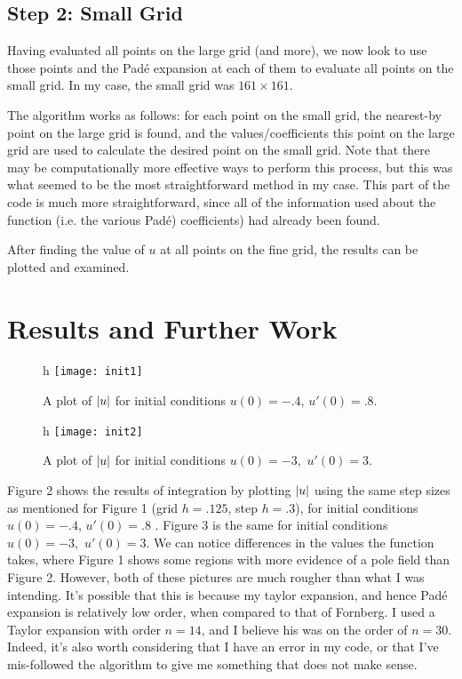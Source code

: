 \documentclass[12pt]{article}
\begin{document}
\subsection{ Step 2: Small Grid }
Having evaluated all points on the large grid (and more), we now look to use those points and the Pad\'{e} expansion at each of them to evaluate all points on the small grid. In my case, the small grid was $161 \times 161.$ 

The algorithm works as follows: for each point on the small grid, the nearest-by point on the large grid is found, and the values/coefficients this point on the large grid are used to calculate the desired point on the small grid. Note that there may be computationally more effective ways to perform this process, but this was what seemed to be the most straightforward method in my case. This part of the code is much more straightforward, since all of the information used about the function (i.e. the various Pad\'{e}) coefficients) had already been found. 

After finding the value of $u$ at all points on the fine grid, the results can be plotted and examined. 

\section{Results and Further Work}

\begin{figure}{h}
 \texttt{[image: init1]}
 \caption{A plot of $\abs{u}$ for initial conditions $u(0) = -.4$, $u'(0)=.8$.}
\end{figure}

\begin{figure}{h}
 \texttt{[image: init2]}
 \caption{A plot of $\abs{u}$ for initial conditions $u(0) = -3,$ $u'(0)=3$.}
\end{figure}

Figure 2 shows the results of integration by plotting $\abs{u}$ using the same step sizes as mentioned for Figure 1 (grid $h = .125$, step $h = .3$), for initial conditions $u(0) = -.4$, $u'(0)=.8$ . Figure 3 is the same for initial conditions $u(0) = -3,$ $u'(0)=3$. We can notice differences in the values the function takes, where Figure 1 shows some regions with more evidence of a pole field than Figure 2. However, both of these pictures are much rougher than what I was intending. It's possible that this is because my taylor expansion, and hence Pad\'{e} expansion is relatively low order, when compared to that of Fornberg. I used a Taylor expansion with order $n = 14$, and I believe his was on the order of $n = 30$. Indeed, it's also worth considering that I have an error in my code, or that I've mis-followed the algorithm to give me something that does not make sense. 
\end{document}
